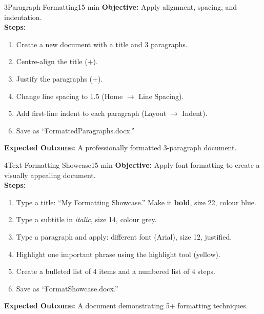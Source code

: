 \begin{labactivity}{3}{Paragraph Formatting}{15 min}
\textbf{Objective:} Apply alignment, spacing, and indentation.\\[4pt]
\textbf{Steps:}
\begin{enumerate}[label=\protect\stepcircle{\arabic*}, leftmargin=2cm, itemsep=4pt]
  \item Create a new document with a title and 3 paragraphs.
  \item Centre-align the title (+).
  \item Justify the paragraphs (+).
  \item Change line spacing to 1.5 (Home $\rightarrow$ Line Spacing).
  \item Add first-line indent to each paragraph (Layout $\rightarrow$ Indent).
  \item Save as ``FormattedParagraphs.docx.''
\end{enumerate}
\textbf{Expected Outcome:} A professionally formatted 3-paragraph document.
\welldone
\end{labactivity}

\begin{labactivity}{4}{Text Formatting Showcase}{15 min}
\textbf{Objective:} Apply font formatting to create a visually appealing document.\\[4pt]
\textbf{Steps:}
\begin{enumerate}[label=\protect\stepcircle{\arabic*}, leftmargin=2cm, itemsep=4pt]
  \item Type a title: ``My Formatting Showcase.'' Make it \textbf{bold}, size 22, colour blue.
  \item Type a subtitle in \textit{italic}, size 14, colour grey.
  \item Type a paragraph and apply: different font (Arial), size 12, justified.
  \item Highlight one important phrase using the highlight tool (yellow).
  \item Create a bulleted list of 4 items and a numbered list of 4 steps.
  \item Save as ``FormatShowcase.docx.''
\end{enumerate}
\textbf{Expected Outcome:} A document demonstrating 5+ formatting techniques.
\welldone
\end{labactivity}

